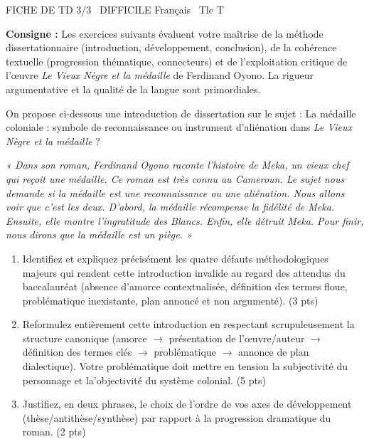 \documentclass[11pt]{article}
\begin{document}
\begin{tcolorbox}[enhanced,colback=popink,colframe=popink,arc=10pt,boxrule=0pt,left=12pt,right=12pt,top=9pt,bottom=9pt]
{\color{white}\popxbold\small FICHE DE TD 3/3 \textbullet\ DIFFICILE \hfill Français \textbullet\ Tle T\par}
\end{tcolorbox}
\vspace{4pt}
\noindent \textbf{Consigne :} Les exercices suivants évaluent votre maîtrise de la méthode dissertationnaire (introduction, développement, conclusion), de la cohérence textuelle (progression thématique, connecteurs) et de l'exploitation critique de l'œuvre \textit{Le Vieux Nègre et la médaille} de Ferdinand Oyono. La rigueur argumentative et la qualité de la langue sont primordiales.

\begin{exercice}
On propose ci-dessous une introduction de dissertation sur le sujet : \og La médaille coloniale : symbole de reconnaissance ou instrument d'aliénation dans \textit{Le Vieux Nègre et la médaille} ? \fg{}

\textit{« Dans son roman, Ferdinand Oyono raconte l'histoire de Meka, un vieux chef qui reçoit une médaille. Ce roman est très connu au Cameroun. Le sujet nous demande si la médaille est une reconnaissance ou une aliénation. Nous allons voir que c'est les deux. D'abord, la médaille récompense la fidélité de Meka. Ensuite, elle montre l'ingratitude des Blancs. Enfin, elle détruit Meka. Pour finir, nous dirons que la médaille est un piège. »}

\begin{enumerate}
    \item Identifiez et expliquez précisément les quatre défauts méthodologiques majeurs qui rendent cette introduction invalide au regard des attendus du baccalauréat (absence d'amorce contextualisée, définition des termes floue, problématique inexistante, plan annoncé et non argumenté). (3 pts)
    \item Reformulez entièrement cette introduction en respectant scrupuleusement la structure canonique (amorce $\rightarrow$ présentation de l'œuvre/auteur $\rightarrow$ définition des termes clés $\rightarrow$ problématique $\rightarrow$ annonce de plan dialectique). Votre problématique doit mettre en tension la subjectivité du personnage et la'objectivité du système colonial. (5 pts)
    \item Justifiez, en deux phrases, le choix de l'ordre de vos axes de développement (thèse/antithèse/synthèse) par rapport à la progression dramatique du roman. (2 pts)
\end{enumerate}
\end{exercice}
\end{document}
